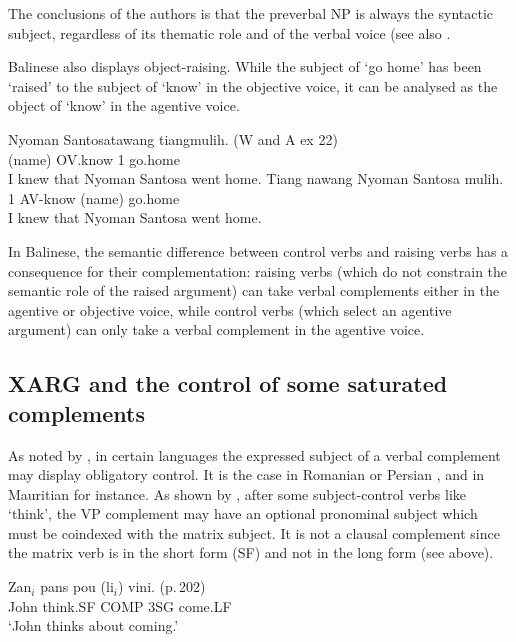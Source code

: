 \documentclass[output=paper]{langsci/langscibook}
\begin{document}
The conclusions of the authors is that the preverbal NP is always the syntactic subject, regardless of its thematic role and of the verbal voice (see also \citealt{ManningandSag1998}.

Balinese also displays object-raising. While the subject of `go home' has been `raised' to the subject of `know' in the objective voice, it can be analysed as the object of `know' in the agentive voice.

\begin{exe}
\ex \begin{xlist}
\ex \gll Nyoman Santosatawang tiangmulih. (W and A ex 22)\\
(name) OV.know 1 go.home\\
\glt I knew that Nyoman Santosa went home.
\ex \gll Tiang nawang Nyoman Santosa mulih.\\
1 AV-know (name) go.home\\
\glt I knew that Nyoman Santosa went home.
\end{xlist}
\end{exe}

In Balinese, the semantic difference between control verbs and raising verbs has a consequence for their complementation: raising verbs (which do not constrain the semantic role of the raised argument) can take verbal complements either in the agentive or objective voice, while control verbs (which select an agentive argument) can only take a verbal complement in the agentive voice.

\subsection{XARG and the control of some saturated complements}

As noted by \citet{Farkas1988}, in certain languages the expressed subject of a verbal complement may display obligatory control. It is the case in Romanian or Persian \citet{Karimi2008}, and in Mauritian for instance. As shown by \citet{HenriandLaurens2011}, after some subject-control verbs like `think', the VP complement may have an optional pronominal subject which must be coindexed with the matrix subject. It is not a clausal complement since the matrix verb is in the short form (SF) and not in the long form (see above).

\begin{exe}
\ex \gll Zan$_{i}$ pans pou (li$_{i}$) vini. (p.\,202)\\
John think.SF COMP 3SG come.LF  \\
 \glt `John thinks about coming.'
\end{exe}
\end{document}
